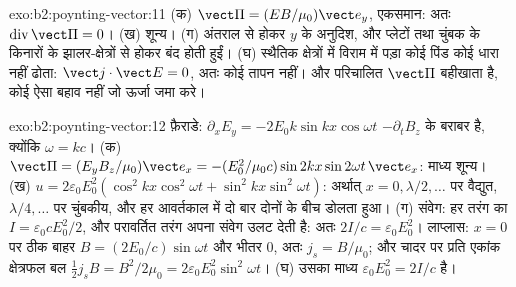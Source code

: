 \begin{solution}{exo:b2:poynting-vector:11}
(क) $\vect\Pi = (EB/\mu_0)\vect e_y$, एकसमान: अतः $\operatorname{div}\vect\Pi = 0$। (ख) शून्य।
(ग) अंतराल से होकर $y$ के अनुदिश, और प्लेटों तथा चुंबक के किनारों के
झालर-क्षेत्रों से होकर बंद होती हुईं। (घ) स्थैतिक क्षेत्रों में विराम में पड़ा
कोई पिंड कोई धारा नहीं ढोता: $\vect j\cdot\vect E = 0$, अतः कोई तापन नहीं। और
परिचालित $\vect\Pi$ बहीखाता है, कोई ऐसा बहाव नहीं जो ऊर्जा जमा करे।
\end{solution}

\begin{solution}{exo:b2:poynting-vector:12}
फ़ैराडे: $\partial_xE_y = -2E_0k\sin kx\cos\omega t$ $-\partial_tB_z$ के बराबर है, क्योंकि
$\omega = kc$। (क)
$\vect\Pi = (E_yB_z/\mu_0)\vect e_x = -(E_0^2/\mu_0c)\sin2kx\sin2\omega t\,\vect e_x$: माध्य
शून्य। (ख) $u = 2\varepsilon_0E_0^2(\cos^2kx\cos^2\omega t + \sin^2kx\sin^2\omega t)$: अर्थात् $x = 0, \lambda/2, \dots$ पर
वैद्युत, $\lambda/4, \dots$ पर चुंबकीय, और हर आवर्तकाल में दो बार दोनों के बीच
डोलता हुआ। (ग) संवेग: हर तरंग का $I = \varepsilon_0cE_0^2/2$, और
परावर्तित तरंग अपना संवेग उलट देती है: अतः $2I/c = \varepsilon_0E_0^2$। लाप्लास: $x =
0$ पर ठीक बाहर $B = (2E_0/c)\sin\omega t$ और भीतर $0$, अतः $j_s = B/\mu_0$; और चादर पर
प्रति एकांक क्षेत्रफल बल $\tfrac12j_sB = B^2/2\mu_0 = 2\varepsilon_0E_0^2\sin^2
\omega t$। (घ) उसका माध्य $\varepsilon_0E_0^2 = 2I/c$ है।
\end{solution}

